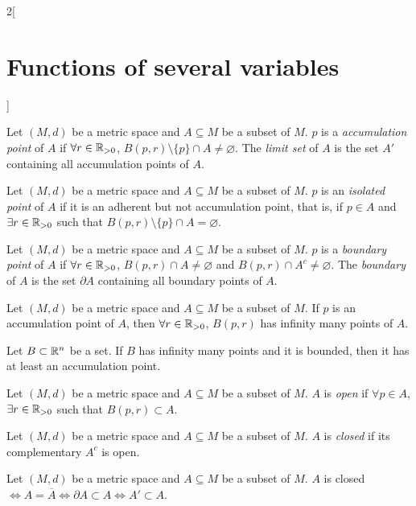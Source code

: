 \documentclass[../../../main.tex]{subfiles}
\begin{document}
\begin{multicols}{2}[\section{Functions of several variables}]
\begin{definition}
  \end{definition}
  \begin{definition}
    Let $(M,d)$ be a metric space and $A\subseteq M$ be a subset of $M$. $p$ is a \emph{accumulation point} of $A$ if $\forall r\in\mathbb{R}_{>0}$, $B(p,r)\setminus\{p\}\cap A\ne\varnothing$. The \emph{limit set} of $A$ is the set $A'$ containing all accumulation points of $A$.
  \end{definition}
  \begin{definition}
    Let $(M,d)$ be a metric space and $A\subseteq M$ be a subset of $M$. $p$ is an \emph{isolated point} of $A$ if it is an adherent but not accumulation point, that is, if $p\in A$ and $\exists r\in\mathbb{R}_{>0}$ such that $B(p,r)\setminus\{p\}\cap A=\varnothing$.
  \end{definition}
  \begin{definition}
    Let $(M,d)$ be a metric space and $A\subseteq M$ be a subset of $M$. $p$ is a \emph{boundary point} of $A$ if $\forall r\in\mathbb{R}_{>0}$, $B(p,r)\cap A\ne\varnothing$ and $B(p,r)\cap A^c\ne\varnothing$. The \emph{boundary} of $A$ is the set $\partial A$ containing all boundary points of $A$.
  \end{definition}
  \begin{proposition}
    Let $(M,d)$ be a metric space and $A\subseteq M$ be a subset of $M$. If $p$ is an accumulation point of $A$, then $\forall r\in\mathbb{R}_{>0}$, $B(p,r)$ has infinity many points of $A$.
  \end{proposition}
  \begin{theorem}
    Let $B\subset\mathbb{R}^n$ be a set. If $B$ has infinity many points and it is bounded, then it has at least an accumulation point.
  \end{theorem}
  \begin{definition}
    Let $(M,d)$ be a metric space and $A\subseteq M$ be a subset of $M$. $A$ is \emph{open} if $\forall p\in A$, $\exists r\in\mathbb{R}_{>0}$ such that $B(p,r)\subset A$.
  \end{definition}
  \begin{definition}
    Let $(M,d)$ be a metric space and $A\subseteq M$ be a subset of $M$. $A$ is \emph{closed} if its complementary $A^c$ is open.
  \end{definition}
  \begin{proposition}
    Let $(M,d)$ be a metric space and $A\subseteq M$ be a subset of $M$. $A$ is closed $\iff A=\overline{A}\iff\partial A\subset A\iff A'\subset A$.
  \end{proposition}

\end{multicols}
\end{document}
